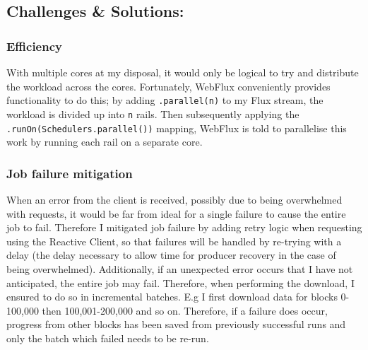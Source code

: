 \subsection{Challenges \& Solutions:}
\subsubsection{Efficiency}
With multiple cores at my disposal, it would only be logical to try and distribute the workload across the cores. Fortunately, WebFlux conveniently provides functionality to do this; by adding \texttt{.parallel(n)} to my Flux stream, the workload is divided up into \texttt{n} rails. Then subsequently applying the \texttt{.runOn(Schedulers.parallel())} mapping, WebFlux is told to parallelise this work by running each rail on a separate core. 
\subsubsection{Job failure mitigation}
When an error from the client is received, possibly due to being overwhelmed with requests, it would be far from ideal for a single failure to cause the entire job to fail. Therefore I mitigated job failure by adding retry logic when requesting using the Reactive Client, so that failures will be handled by re-trying with a delay (the delay necessary to allow time for producer recovery in the case of being overwhelmed). Additionally, if an unexpected error occurs that I have not anticipated, the entire job may fail. Therefore, when performing the download, I ensured to do so in incremental batches. E.g I first download data for blocks 0-100,000 then 100,001-200,000 and so on. Therefore, if a failure does occur, progress from other blocks has been saved from previously successful runs and only the batch which failed needs to be re-run. 

